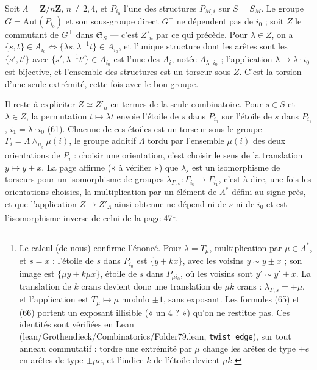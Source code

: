 \documentclass[11pt,a4paper]{article}
\begin{document}
Soit $\Lambda = \mathbf{Z}/n\mathbf{Z}$, $n \neq 2, 4$, et $P_{i_0}$ l'une des
structures $P_{M,i}$ sur $S = S_M$. Le groupe $G = \mathrm{Aut}(P_{i_0})$ et
son sous-groupe direct $G^{+}$ ne dépendent pas de $i_0$ ; soit $Z$ le
commutant de $G^{+}$ dans $\mathfrak{S}_S$ --- c'est $Z'_n$ par ce qui précède.
Pour $\lambda \in Z$, on a $\{s, t\} \in A_{i_0} \iff \{\lambda s,
\lambda^{-1} t\} \in A_{i_0}$, et l'unique structure dont les arêtes sont les
$\{s', t'\}$ avec $\{s', \lambda^{-1} t'\} \in A_{i_0}$ est l'une des
$A_i$, notée $A_{\lambda \cdot i_0}$ ; l'application $\lambda \mapsto \lambda
\cdot i_0$ est bijective, et l'ensemble des structures est un torseur sous
$Z$. C'est la torsion d'une seule extrémité, cette fois avec le bon groupe.

Il reste à expliciter $Z \simeq Z'_n$ en termes de la seule combinatoire. Pour
$s \in S$ et $\lambda \in Z$, la permutation $t \mapsto \lambda t$ envoie
l'étoile de $s$ dans $P_{i_0}$ sur l'étoile de $s$ dans $P_{i_1}$, $i_1 =
\lambda \cdot i_0$ (61). Chacune de ces étoiles est un torseur sous le groupe
$\Gamma_i = \Lambda \wedge_{\mu_2} \mu(i)$, le groupe additif $\Lambda$ tordu
par l'ensemble $\mu(i)$ des deux orientations de $P_i$ : choisir une
orientation, c'est choisir le sens de la translation $y \mapsto y + x$. La page
affirme (« à vérifier ») que $\lambda_s$ est un isomorphisme de torseurs pour
un isomorphisme de groupes $\lambda_{\Gamma, s} : \Gamma_{i_0} \to
\Gamma_{i_1}$, c'est-à-dire, une fois les orientations choisies, la
multiplication par un élément de $\Lambda^{*}$ défini au signe près, et que
l'application $Z \to Z'_\Lambda$ ainsi obtenue ne dépend ni de $s$ ni de $i_0$
et est l'isomorphisme inverse de celui de la page 47\footnote{Le calcul (de
nous) confirme l'énoncé. Pour $\lambda = T_\mu$, multiplication par $\mu \in
\Lambda^{*}$, et $s = \dot x$ : l'étoile de $s$ dans $P_{i_0}$ est $\{y + kx\}$,
avec les voisins $y \sim y \pm x$ ; son image est $\{\mu y + k\mu x\}$, étoile
de $s$ dans $P_{\mu i_0}$, où les voisins sont $y' \sim y' \pm x$. La
translation de $k$ crans devient donc une translation de $\mu k$ crans :
$\lambda_{\Gamma, s} = \pm\mu$, et l'application est $T_\mu \mapsto \mu$ modulo
$\pm 1$, sans exposant. Les formules (65) et (66) portent un exposant illisible
(« un $4$ ? ») qu'on ne restitue pas. Ces identités sont vérifiées en Lean
(lean/Grothendieck/Combinatorics/Folder79.lean, \texttt{twist\_edge}), sur tout anneau
commutatif : tordre une extrémité par $\mu$ change les arêtes de type $\pm e$ en
arêtes de type $\pm\mu e$, et l'indice $k$ de l'étoile devient $\mu k$.}.
\end{document}
